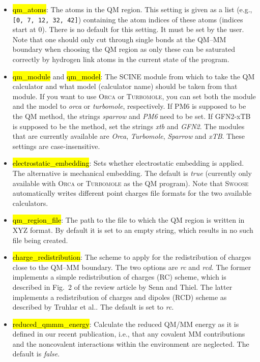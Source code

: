 \documentclass[]{tufte-book}
\begin{document}
{{\begin{itemize}
\item \hl{qm\_atoms}: The atoms in the QM region. This setting is given as a list (e.g., \texttt{[0, 7, 12, 32, 42]}) containing the atom indices of these atoms (indices start at 0). There is no default for this setting. It must be set by the user. Note that one should only cut through single bonds at the QM--MM boundary when choosing the QM region as only these can be saturated correctly by hydrogen link atoms in the current state of the program.


\item \hl{qm\_module} and \hl{qm\_model}: The SCINE module from which to take the QM calculator and what model (calculator name) should be taken from that module. If you want to use \textsc{Orca} or \textsc{Turbomole}, you can set both the module and the model to \textit{orca} or \textit{turbomole}, respectively. If PM6 is supposed to be the QM method, the strings \textit{sparrow} and \textit{PM6} need to be set. If GFN2-xTB is supposed to be the method, set the strings \textit{xtb} and \textit{GFN2}. The modules that are currently available are \textit{Orca}, \textit{Turbomole}, \textit{Sparrow} and \textit{xTB}. These settings are case-insensitive.
\item \hl{electrostatic\_embedding}: Sets whether electrostatic embedding is applied. The alternative is mechanical embedding. The default is \textit{true} (currently only available with \textsc{Orca} or \textsc{Turbomole} as the QM program). Note that \textsc{Swoose} automatically writes different point charges file formats for the two available calculators.
\item \hl{qm\_region\_file}: The path to the file to which the QM region is written in XYZ format. By default it is set to an empty string, which results in no such file being created.
\item \hl{charge\_redistribution}: The scheme to apply for the redistribution of charges close to the QM--MM boundary. The two options are \textit{rc} and \textit{rcd}. The former implements a simple redistribution of charges (RC) scheme, which is described in Fig.~2 of the review article by Senn and Thiel\cite{senn09}. The latter implements a redistribution of charges and dipoles (RCD) scheme as described by Truhlar et al.\cite{lin05}. The default is set to \textit{rc}.
\item \hl{reduced\_qmmm\_energy}: Calculate the reduced QM/MM energy as it is defined in our recent publication\cite{brunken21}, i.e., that any covalent MM contributions and the noncovalent interactions
within the environment are neglected. The default is \textit{false}.


\end{itemize}}}
\end{document}
